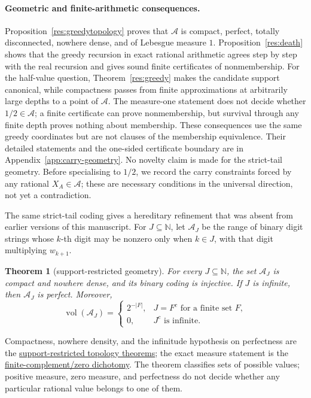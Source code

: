 \documentclass[11pt]{article}
\newcommand{\commit}{99f4bf47422abbd8757cbb22b50ba079d764d3a7}
\newcommand{\repobase}{https://github.com/wcook04/plectis-erdos/blob/\commit}
\newtheorem{theorem}{Theorem}[section]
\theoremstyle{definition}
\theoremstyle{remark}
\newcommand{\N}{\mathbb{N}}
\begin{document}
\paragraph{Geometric and finite-arithmetic consequences.}
Proposition~\ref{res:greedytopology} proves that \(\mathcal A\) is compact,
perfect, totally disconnected, nowhere dense, and of Lebesgue measure \(1\).
Proposition~\ref{res:death} shows that the greedy recursion in exact rational
arithmetic agrees step by step with the real recursion and gives sound finite
certificates of nonmembership.
For the half-value question, Theorem~\ref{res:greedy} makes the candidate
support canonical, while compactness passes from finite approximations at
arbitrarily large depths to a point of \(\mathcal A\).  The measure-one statement does
not decide whether \(1/2\in\mathcal A\); a finite certificate can prove
nonmembership, but survival through any finite depth proves nothing about
membership.  These consequences use the same greedy coordinates but are not
clauses of the membership equivalence.  Their detailed statements and the
one-sided certificate boundary are in Appendix~\ref{app:carry-geometry}.  No
novelty claim is made for the strict-tail geometry.  Before specialising to
\(1/2\), we record the carry constraints forced by any rational
\(X_A\in\mathcal A\); these are necessary conditions in the universal
direction, not yet a contradiction.

The same strict-tail coding gives a hereditary refinement that was absent
from earlier versions of this manuscript.  For \(J\subseteq\N\), let
\(\mathcal A_J\) be the range of binary digit strings whose \(k\)-th digit
may be nonzero only when \(k\in J\), with that digit multiplying
\(w_{k+1}\).

\begin{theorem}[support-restricted geometry]\label{res:supportedgeometry}
For every \(J\subseteq\N\), the set \(\mathcal A_J\) is compact and nowhere
dense, and its binary coding is injective.  If \(J\) is infinite, then
\(\mathcal A_J\) is perfect.  Moreover,
\[
 \operatorname{vol}(\mathcal A_J)=
 \begin{cases}
   2^{-|F|},&J=F^c\text{ for a finite set }F,\\
   0,&J^c\text{ is infinite}.
 \end{cases}
\]
\end{theorem}
\noindent Compactness, nowhere density, and the infinitude hypothesis on
perfectness are the
\href{\repobase/ErdosProblems/Erdos257/MersenneSubseriesRigidity.lean\#L90}{support-restricted topology theorems};
the exact measure statement is the
\href{\repobase/ErdosProblems/Erdos257/MersenneSubseriesRigidity.lean\#L397}{finite-complement/zero dichotomy}.
The theorem classifies sets of possible values; positive measure, zero
measure, and perfectness do not decide whether any particular rational value
belongs to one of them.
\end{document}
